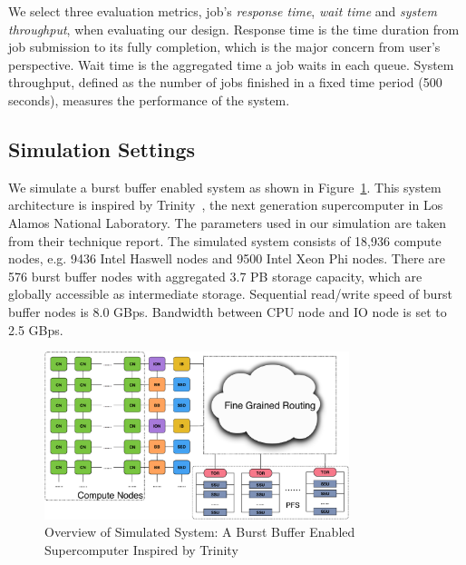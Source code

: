 We select three evaluation metrics, job's \textit{response time}, \textit{wait time} and 
\textit{system throughput}, when evaluating our design.
Response time is the time duration from job submission to its fully completion,
which is the major concern from user's perspective.
Wait time is the aggregated time a job waits in each queue.
System throughput, defined as the number of jobs finished in
a fixed time period (500 seconds), measures the performance of the system.


\subsection{Simulation Settings}


We simulate a burst buffer enabled system as shown in Figure~\ref{Fig:BBArchitecture}.
This system architecture is inspired by Trinity~\cite{TrinitySystem}, 
the next generation supercomputer in Los Alamos National Laboratory.
The parameters used in our simulation are taken from their technique report\cite{BBUseCase}.
The simulated system consists of 18,936 compute nodes,
e.g. 9436 Intel Haswell nodes and 9500 Intel Xeon Phi nodes.
There are 576 burst buffer nodes with aggregated 3.7 PB storage capacity, 
which are globally accessible as intermediate storage.
Sequential read/write speed of burst buffer nodes is 8.0 GBps.
Bandwidth between CPU node and IO node is set to 2.5 GBps.

\begin{figure}[!t]
        \centering
        \includegraphics[width= 3.5in]{BBArchitectureShort}
        \caption{Overview of Simulated System: A Burst Buffer Enabled Supercomputer Inspired by Trinity}
        \label{Fig:BBArchitecture}
\end{figure}

